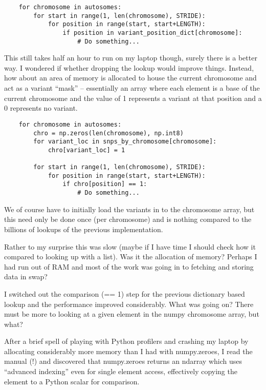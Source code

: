 \begin{verbatim}
    for chromosome in autosomes:
        for start in range(1, len(chromosome), STRIDE):
            for position in range(start, start+LENGTH):
                if position in variant_position_dict[chromosome]:
                    # Do something...
\end{verbatim}

This still takes half an hour to run on my laptop though, surely there
is a better way.  I wondered if whether dropping the lookup would improve
things. Instead, how about an area of memory is allocated to house the current
chromosome and act as a variant “mask” -- essentially an array where each element
is a base of the current chromosome and the value of 1 represents a variant at
that position and a 0 represents no variant.

\begin{verbatim}
    for chromosome in autosomes:
        chro = np.zeros(len(chromosome), np.int8)
        for variant_loc in snps_by_chromosome[chromosome]:
            chro[variant_loc] = 1

        for start in range(1, len(chromosome), STRIDE):
            for position in range(start, start+LENGTH):
                if chro[position] == 1:
                    # Do something...
\end{verbatim}

We of course have to initially load the variants in to the chromosome array,
but this need only be done once (per chromosome) and is nothing compared to the
billions of lookups of the previous implementation.

Rather to my surprise this was slow  (maybe if I have time I should
check how it compared to looking up with a list). Was it the allocation of
memory? Perhaps I had run out of RAM and most of the work was going in to
fetching and storing data in swap?

I switched out the comparison (== 1) step for the previous dictionary based
lookup and the performance improved considerably. What was going on? There must
be more to looking at a given element in the numpy chromosome array, but what?

After a brief spell of playing with Python profilers and crashing my laptop by
allocating considerably more memory than I had with numpy.zeroes, I read the
manual (!) and discovered that numpy.zeroes returns an ndarray which uses
“advanced indexing” even for single element access, effectively copying the
element to a Python scalar for comparison.

